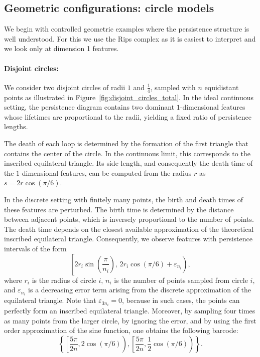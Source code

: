 \documentclass[11pt]{amsart}
\theoremstyle{definition}
\begin{document}

\subsection{Geometric configurations: circle models}

We begin with controlled geometric examples where the persistence structure is well understood. For this we use the Rips complex as it is easiest to interpret and we look only at dimension 1 features.

\medskip

\paragraph{{\bf Disjoint circles:}}
We consider two disjoint circles of radii $1$ and $\tfrac{1}{4}$, sampled with $n$ equidistant points as illustrated in Figure~\ref{fig:disjoint_circles_total}. In the ideal continuous setting, the persistence diagram contains two dominant $1$-dimensional features whose lifetimes are proportional to the radii, yielding a fixed ratio of persistence lengths.

The death of each loop is determined by the formation of the first triangle that contains the center of the circle. In the continuous limit, this corresponds to the inscribed equilateral triangle. Its side length, and consequently the death time of the $1$-dimensional features, can be computed from the radius $r$ as $s=2r\cos(\pi/6)$.


In the discrete setting with finitely many points, the birth and death times of these features are perturbed. The birth time is determined by the distance between adjacent points, which is inversely proportional to the number of points. The death time depends on the closest available approximation of the theoretical inscribed equilateral triangle. Consequently, we observe features with persistence intervals of the form
\[
    \left[2r_i\sin(\frac{\pi}{n_i}),\,  2r_i\cos(\pi/6)+\varepsilon_{n_i}\right),
\]
where $r_i$ is the radius of circle $i$, $n_i$ is the number of points sampled from circle $i$, and $\varepsilon_{n_i}$ is a decreasing error term arising from the discrete approximation of the equilateral triangle. Note that $\varepsilon_{3n_i}=0$, because in such cases, the points can perfectly form an inscribed equilateral triangle. Moreover, by sampling four times as many points from the larger circle, by ignoring the error, and by using the first order approximation of the sine function, one obtains the following barcode: 
\[\left\{\left[\frac{5\pi}{2n}, 2\cos(\pi/6)\right), \left[\frac{5\pi}{2n}, \frac{1}{2}\cos(\pi/6)\right)\right\}.
\]
\end{document}
